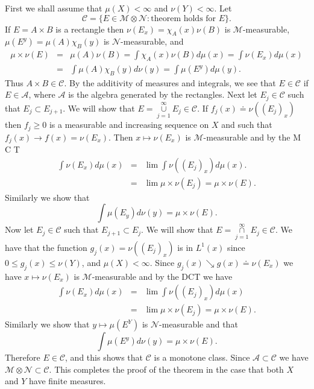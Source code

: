 \documentclass[12pt]{report}
\begin{document}
  First we shall assume that $\mu(X) < \infty$ and
$\nu(Y) <
\infty$.  Let
\[
\mathcal{C} = \{E \in \mathcal{M} \otimes \mathcal{N}: \mbox{theorem
holds for } E\}.
\] If $E = A \times B$ is a rectangle then  $\nu(E_x) = \chi_A (x) \nu(B)$ is
$\mathcal{M}$-measurable, $\mu(E^y) = \mu(A) \chi_B(y)$ is
$\mathcal{N}$-measurable, and 
\begin{eqnarray*}
\mu \times \nu (E) &=& \mu(A) \nu(B) = \int \chi_A (x) \nu(B) d \mu(x) =
\int
\nu(E_x) d \mu(x)\\ &=& \int \mu(A) \chi_B (y) d \nu(y) = \int \mu(E^y) d
\mu(y).
\end{eqnarray*} Thus $A \times B \in \mathcal{C}$.  By the additivity of
measures and integrals, we see that $E \in \mathcal{C}$ if $E \in
\mathcal{A}$, where  $\mathcal{A}$ is the algebra generated by 
the rectangles. 
 Next let
$E_j
\in \mathcal{C}$ such that $E_j \subset E_{j+1}$. 
 We will show that $E =\overset{\infty}{\underset{j=1}{\cup}}E_j  \in
\mathcal{C}$.  If $f_j(x) \doteq
\nu((E_j)_x)$ then $f_j \ge 0 $ is a measurable and increasing sequence
on $X$ and such that
$f_j(x) \longrightarrow f(x) = \nu(E_x)$.  Then $x \longmapsto \nu(E_x)$
is $\mathcal{M}$-measurable and by the  M C T
\begin{eqnarray*}
\int \nu(E_x) d \mu(x) &=& \lim \int \nu((E_j)_x) d \mu (x). \\ &=& \lim
\mu \times \nu (E_j) = \mu \times \nu(E).
\end{eqnarray*} 
Similarly we show that 
\[
\int \mu(E_y) d \nu(y) = \mu \times \nu(E).
\] Now let $E_j \in \mathcal{C}$ such that $E_{j+1} \subset E_j$.  We will
show that $E =\overset{\infty}{\underset{j=1}{\cap}}E_j \in
\mathcal{C}$.    We have that the function
$g_j(x) = \nu((E_j)_x)$ is in $L^1(x)$ since  $0 \le g_j(x) \le \nu(Y)$, and
$\mu(X) < \infty$.  Since $g_j (x) \searrow g(x) \doteq \nu(E_x)$ we have
$x
\longmapsto \nu(E_x)$ is $\mathcal{M}$-measurable and by the  
DCT we have
\begin{eqnarray*}
\int \nu(E_x) d \mu(x) &=& \lim \int \nu((E_j)_x) d \mu(x)\\ &=& \lim
\mu
\times \nu(E_j) = \mu\times \nu(E).
\end{eqnarray*} Similarly we show that $y \longmapsto \mu(E^Y)$ is
$\mathcal{N}$-measurable and that
\[
\int \mu(E^y) d \nu(y) = \mu \times \nu (E).
\] Therefore $E \in \mathcal{C}$, and this shows that $\mathcal{C}$ is a
monotone class. Since $\mathcal{A} \subset \mathcal{C}$ we have
$\mathcal{M} \otimes
\mathcal{N} \subset \mathcal{C}$.  This completes the proof of the
theorem in the case that both $X$ and $Y$ have finite measures.  
\end{document}
